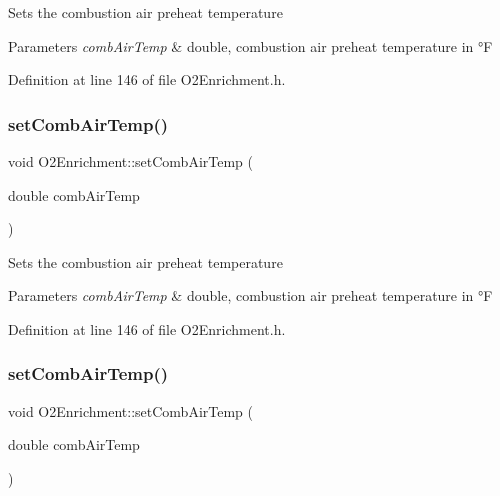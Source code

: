 Sets the combustion air preheat temperature 
\begin{DoxyParams}{Parameters}
{\em comb\+Air\+Temp} & double, combustion air preheat temperature in °F \\
\hline
\end{DoxyParams}


Definition at line 146 of file O2\+Enrichment.\+h.

\mbox{\label{class_o2_enrichment_a70636d71deb4db00ddf761b0dffa3f36}} 
\subsubsection{\texorpdfstring{set\+Comb\+Air\+Temp()}{setCombAirTemp()}\hspace{0.1cm}{\footnotesize\ttfamily [2/3]}}
{\footnotesize\ttfamily void O2\+Enrichment\+::set\+Comb\+Air\+Temp (\begin{DoxyParamCaption}\item[{double}]{comb\+Air\+Temp }\end{DoxyParamCaption})\hspace{0.3cm}{\ttfamily [inline]}}

Sets the combustion air preheat temperature 
\begin{DoxyParams}{Parameters}
{\em comb\+Air\+Temp} & double, combustion air preheat temperature in °F \\
\hline
\end{DoxyParams}


Definition at line 146 of file O2\+Enrichment.\+h.

\mbox{\label{class_o2_enrichment_a70636d71deb4db00ddf761b0dffa3f36}} 
\subsubsection{\texorpdfstring{set\+Comb\+Air\+Temp()}{setCombAirTemp()}\hspace{0.1cm}{\footnotesize\ttfamily [3/3]}}
{\footnotesize\ttfamily void O2\+Enrichment\+::set\+Comb\+Air\+Temp (\begin{DoxyParamCaption}\item[{double}]{comb\+Air\+Temp }\end{DoxyParamCaption})\hspace{0.3cm}{\ttfamily [inline]}}

